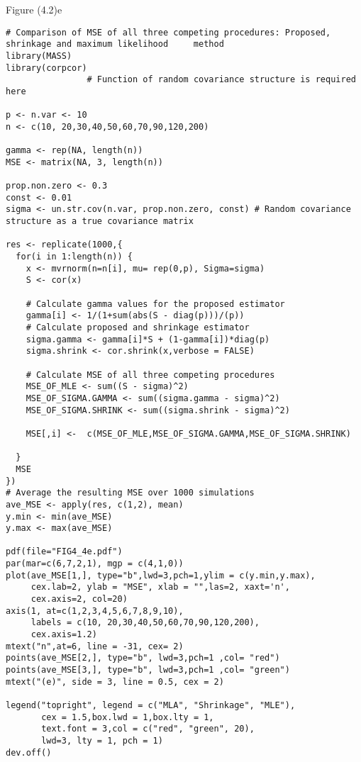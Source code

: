 Figure (4.2)e
\begin{lstlisting}
# Comparison of MSE of all three competing procedures: Proposed, shrinkage and maximum likelihood     method
library(MASS)
library(corpcor)
                # Function of random covariance structure is required here

p <- n.var <- 10
n <- c(10, 20,30,40,50,60,70,90,120,200)

gamma <- rep(NA, length(n))
MSE <- matrix(NA, 3, length(n))

prop.non.zero <- 0.3
const <- 0.01
sigma <- un.str.cov(n.var, prop.non.zero, const) # Random covariance structure as a true covariance matrix

res <- replicate(1000,{
  for(i in 1:length(n)) {
    x <- mvrnorm(n=n[i], mu= rep(0,p), Sigma=sigma)
    S <- cor(x)
    
    # Calculate gamma values for the proposed estimator
    gamma[i] <- 1/(1+sum(abs(S - diag(p)))/(p))
    # Calculate proposed and shrinkage estimator 
    sigma.gamma <- gamma[i]*S + (1-gamma[i])*diag(p)
    sigma.shrink <- cor.shrink(x,verbose = FALSE)
    
    # Calculate MSE of all three competing procedures
    MSE_OF_MLE <- sum((S - sigma)^2)
    MSE_OF_SIGMA.GAMMA <- sum((sigma.gamma - sigma)^2)
    MSE_OF_SIGMA.SHRINK <- sum((sigma.shrink - sigma)^2)
    
    MSE[,i] <-  c(MSE_OF_MLE,MSE_OF_SIGMA.GAMMA,MSE_OF_SIGMA.SHRINK)
    
  }
  MSE
})
# Average the resulting MSE over 1000 simulations
ave_MSE <- apply(res, c(1,2), mean)
y.min <- min(ave_MSE)
y.max <- max(ave_MSE)

pdf(file="FIG4_4e.pdf")
par(mar=c(6,7,2,1), mgp = c(4,1,0))
plot(ave_MSE[1,], type="b",lwd=3,pch=1,ylim = c(y.min,y.max),
     cex.lab=2, ylab = "MSE", xlab = "",las=2, xaxt='n',
     cex.axis=2, col=20)
axis(1, at=c(1,2,3,4,5,6,7,8,9,10),
     labels = c(10, 20,30,40,50,60,70,90,120,200),
     cex.axis=1.2)
mtext("n",at=6, line = -31, cex= 2)
points(ave_MSE[2,], type="b", lwd=3,pch=1 ,col= "red")
points(ave_MSE[3,], type="b", lwd=3,pch=1 ,col= "green")
mtext("(e)", side = 3, line = 0.5, cex = 2)

legend("topright", legend = c("MLA", "Shrinkage", "MLE"),
       cex = 1.5,box.lwd = 1,box.lty = 1,
       text.font = 3,col = c("red", "green", 20),
       lwd=3, lty = 1, pch = 1)
dev.off()
\end{lstlisting}

